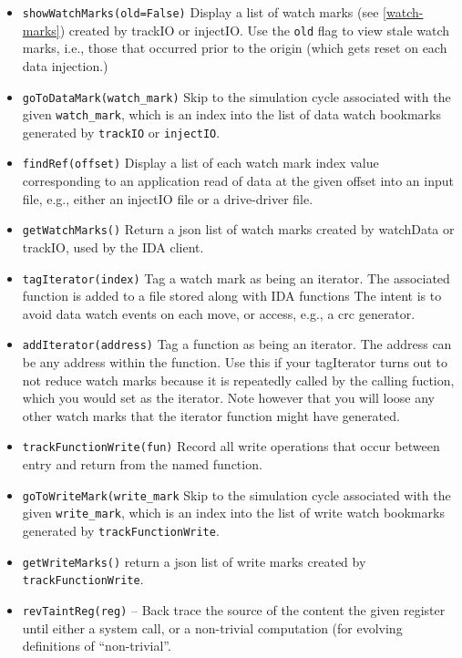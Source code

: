 \documentclass[titlepage]{article}
\begin{document}
\begin{itemize}
\item {\tt showWatchMarks(old=False)} Display a list of watch marks (see \ref{watch-marks}) created by trackIO or injectIO.  Use the {\tt old} flag to view stale watch marks, i.e., 
those that occurred prior to the origin (which gets reset on each data injection.)

\item {\tt goToDataMark(watch\_mark)}  Skip to the simulation cycle associated with the given {\tt watch\_mark}, which is an index into the list of data watch bookmarks generated by {\tt trackIO} or {\tt injectIO}.

\item {\tt findRef(offset)} Display a list of each watch mark index value corresponding to an application read of data at the given offset into
an input file, e.g., either an injectIO file or a drive-driver file.

\item {\tt getWatchMarks()} Return a json list of watch marks created by watchData or trackIO, used by the IDA client.

\item {\tt tagIterator(index)} Tag a watch mark as being an iterator.  The associated function is added to a file stored along with IDA functions
The intent is to avoid data watch events on each move, or access, e.g., a crc generator.

\item {\tt addIterator(address)} Tag a function as being an iterator. The address can be any address within the function.  Use this if your tagIterator turns out
to not reduce watch marks because it is repeatedly called by the calling fuction, which you would set as the iterator.  Note however that you will loose any other watch
marks that the iterator function might have generated. 

\item {\tt trackFunctionWrite(fun)} Record all write operations that occur between entry and return from the named function.

\item {\tt goToWriteMark(write\_mark} Skip to the simulation cycle associated with the given {\tt write\_mark}, which is an index into the list of 
write watch bookmarks generated by {\tt trackFunctionWrite}.

\item {\tt getWriteMarks()} return a json list of write marks created by {\tt trackFunctionWrite}.

\item {\tt revTaintReg(reg)} – Back trace the source of the content the given register until either a system call, or a non-trivial computation (for evolving definitions of “non-trivial”.  


\end{itemize}
\end{document}
